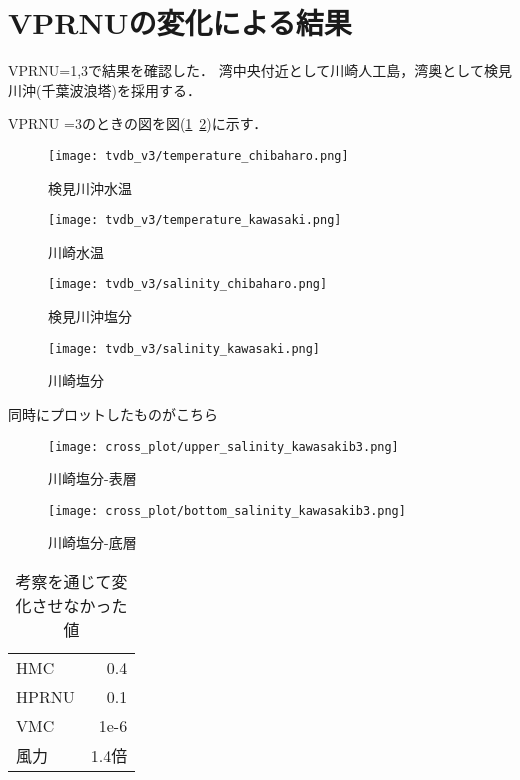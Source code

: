 \documentclass[report,fontsize=12pt]{ltjsarticle}
\begin{document}
\section{VPRNUの変化による結果}
VPRNU=1,3で結果を確認した．
湾中央付近として川崎人工島，湾奥として検見川沖(千葉波浪塔)を採用する．

VPRNU =3のときの図を図(\ref{VPRNU=1}~\ref{VPRNU=1おわり})に示す．
\begin{figure}[hbtp]
    \centering
    \texttt{[image: tvdb\_v3/temperature\_chibaharo.png]}
    \caption{検見川沖水温}
    \label{VPRNU=1}
\end{figure}
\begin{figure}[hbtp]
    \centering
    \texttt{[image: tvdb\_v3/temperature\_kawasaki.png]}
    \caption{川崎水温}
\end{figure}
\begin{figure}[hbtp]
    \centering
    \texttt{[image: tvdb\_v3/salinity\_chibaharo.png]}
    \caption{検見川沖塩分}
\end{figure}
\begin{figure}[hbtp]
    \centering
    \texttt{[image: tvdb\_v3/salinity\_kawasaki.png]}
    \caption{川崎塩分}
    \label{VPRNU=1おわり}
\end{figure}

\clearpage
同時にプロットしたものがこちら
\begin{figure}[hbtp]
    \centering
    \texttt{[image: cross\_plot/upper\_salinity\_kawasakib3.png]}
    \caption{川崎塩分-表層}

\end{figure}
\begin{figure}[hbtp]
    \centering
    \texttt{[image: cross\_plot/bottom\_salinity\_kawasakib3.png]}
    \caption{川崎塩分-底層}

\end{figure}
\clearpage
\begin{table}
    \centering
    \begin{tabular}[b]{|l||r|} \hline
      HMC   & 0.4 \\
      HPRNU & 0.1 \\
      VMC & 1e-6 \\
      風力 & 1.4倍 \\ \hline

     \end{tabular}
\caption{考察を通じて変化させなかった値}
\end{table}
\end{document}
